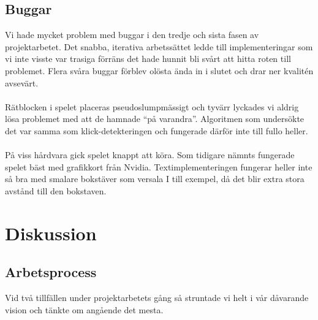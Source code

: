 \documentclass[a4paper]{article}
\begin{document}
\subsection{Buggar}
Vi hade mycket problem med buggar i den tredje och sista fasen av projektarbetet. Det snabba, iterativa arbetssättet ledde till implementeringar som vi inte visste var trasiga förräns det hade hunnit bli svårt att hitta roten till problemet. Flera svåra buggar förblev olösta ända in i slutet och drar ner kvalitén avsevärt.
\\
\\
Rätblocken i spelet placeras pseudoslumpmässigt och tyvärr lyckades vi aldrig lösa problemet med att de hamnade “på varandra”. Algoritmen som undersökte det var samma som klick-detekteringen och fungerade därför inte till fullo heller.
\\
\\
På viss hårdvara gick spelet knappt att köra. Som tidigare nämnts fungerade spelet bäst med grafikkort från Nvidia. Textimplementeringen fungerar heller inte så bra med smalare bokstäver som versala I till exempel, då det blir extra stora avstånd till den bokstaven.


\newpage
\section{Diskussion}
\subsection{Arbetsprocess}
Vid två tillfällen under projektarbetets gång så struntade vi helt i vår dåvarande vision och tänkte om angående det mesta. 
\end{document}
